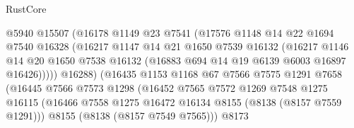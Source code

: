 \begin{lexlean}{RustCore}
\begin{coremodule}
                                  @5940
                                  @15507
                                  (@16178
                                    @1149
                                    @23
                                    @7541
                                    (@17576
                                      @1148
                                      @14
                                      @22
                                      @1694
                                      @7540
                                      @16328
                                      (@16217
                                        @1147
                                        @14
                                        @21
                                        @1650
                                        @7539
                                        @16132
                                        (@16217
                                          @1146
                                          @14
                                          @20
                                          @1650
                                          @7538
                                          @16132
                                          (@16883 @694 @14 @19 @6139 @6003 @16897 @16426)))))
                                  @16288)
                                (@16435
                                  @1153
                                  @1168
                                  @67
                                  @7566
                                  @7575
                                  @1291
                                  @7658
                                  (@16445
                                    @7566
                                    @7573
                                    @1298
                                    (@16452
                                      @7565
                                      @7572
                                      @1269
                                      @7548
                                      @1275
                                      @16115
                                      (@16466
                                        @7558
                                        @1275
                                        @16472
                                        @16134
                                        @8155
                                        (@8138 (@8157 @7559 @1291)))
                                      @8155
                                      (@8138 (@8157 @7549 @7565)))
                                    @8173

\end{coremodule}
\end{lexlean}
